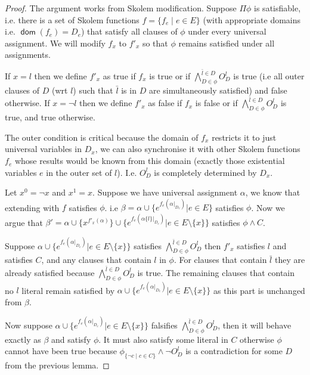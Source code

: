 \documentclass[runningheads]{llncs}
\DeclareMathOperator*{\dom}{\textsf{dom}}
\begin{document}
	\begin{proof}
		The argument works from Skolem modification.
		Suppose $\Pi \phi$ is satisfiable, i.e. there is a set of Skolem functions $f=\{f_e \mid e\in E \}$ (with appropriate domains i.e. $\dom(f_e)=D_e$) that satisfy all clauses of $\phi$ under every universal assignment.
		We will modify $f_x$ to $f'_x$ so that $\phi$ remains satisfied under all assignments.
		
		If $x=l$ then  we define $f'_x$ as true if $f_x$ is true or if $\bigwedge^{\bar l \in D }_{D\in \phi} O^l_D$ is true (i.e all outer clauses of $D$ (wrt $l$) such that $\bar l$ is in $D$  are simultaneously satisfied) and false otherwise.
		If $x=\lnot l$ then we define $f'_x$ as false if $f_x$ is false or if $\bigwedge^{\bar l \in D}_{D\in \phi} O^l_D$ is true, and true otherwise. 
		
		The outer condition is critical because the domain of $f_x$ restricts it to just universal variables in $D_x$, we can also synchronise it with other Skolem functions $f_e$ whose results would be known from this domain (exactly those existential variables $e$ in the outer set of $l$). I.e. $O^l_D$ is completely determined by $D_x$. 
		
		
		Let $x^{0}=\lnot x$ and $x^1= x$.
		Suppose we have universal assignment $\alpha$, we know that extending with $f$ satisfies $\phi$. i.e $\beta= \alpha\cup \{e^{f_e(\alpha |_{D_e})} | e\in E\}$ satisfies $\phi$.
		Now we argue that $\beta'= \alpha\cup\{x^{f'_x(\alpha)}\}\cup \{e^{f_e(\alpha \{l \}|_{D_e})} | e\in E\setminus\{x\}\}$  satisfies $\phi\wedge C$.
		
		Suppose $\alpha\cup\{e^{f_e(\alpha|_{D_e})} | e\in E\setminus\{x\}\}$ satisfies $\bigwedge^{\bar l \in D }_{D\in \phi} O^l_D$ then $f'_x$ satisfies $l$ and satisfies $C$, and any clauses that contain $l$ in $\phi$. For clauses that contain $\bar l$ they are already satisfied because  $\bigwedge^{\bar l \in D }_{D\in \phi} O^l_D$ is true. The remaining clauses that contain no $l$ literal remain satisfied by $\alpha\cup\{e^{f_e(\alpha|_{D_e})} | e\in E\setminus\{x\}\}$ as this part is unchanged from $\beta$. 
		
		Now suppose  $\alpha\cup\{e^{f_e(\alpha|_{D_e})} | e\in E\setminus\{x\}\}$ falsifies $\bigwedge^{\bar l \in D }_{D\in \phi} O^l_D$, then it will behave exactly as $\beta$ and satisfy $\phi$. It must also satisfy some literal in $C$ otherwise $\phi$ cannot have been true because $\phi_{\{\neg c \mid c \in C\}}\wedge \lnot O^l_D$ is a contradiction for some $D$ from the previous lemma.
		
		

		
		
	\end{proof}
	
\end{document}
